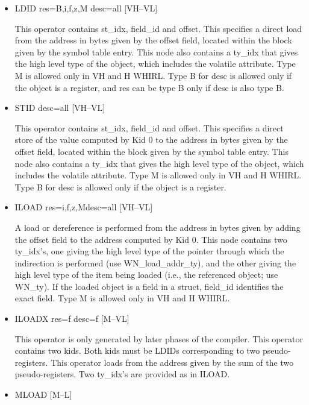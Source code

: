 \begin{itemize}

\item
{}%
LDID res=B,i,f,z,M desc=all \hfill [VH--VL]

This operator contains st\_idx, field\_id and offset. This specifies
a direct load from the address in bytes given by the offset field,
located within the
block given by the symbol table entry. This node also contains a
ty\_idx that gives the high level type of the object, which includes
the volatile attribute. Type M is allowed only in VH and H WHIRL.
Type B for desc is allowed only if the object is a register, and
res can be type B only if desc is also type B. 

\item
{}%
STID desc=all \hfill [VH--VL]

This operator contains st\_idx, field\_id and offset. This specifies
a direct store of the value computed by Kid 0 to the address in
bytes given by the
offset field, located within the block given by the symbol table
entry. This node also contains a ty\_idx that gives the high level
type of the object, which includes the volatile attribute. Type M
is allowed only in VH and H WHIRL. Type B for desc is allowed only
if the object is a register.

\item
{}%
ILOAD res=i,f,z,Mdesc=all \hfill [VH--VL]

A load or dereference is performed from the address in bytes given by
adding the offset field to the address computed by Kid 0. This node
contains two ty\_idx's, one giving the high level type of the pointer
through which the indirection is performed (use WN\_load\_addr\_ty),
and the other giving the high level type of the item being loaded
(i.e., the referenced object; use WN\_ty). If the loaded object is a
field in a struct, field\_id identifies the exact field.  Type M is
allowed only in VH and H WHIRL.

\item
{}%
ILOADX res=f desc=f \hfill [M--VL]

This operator is only generated by later phases of the compiler.
This operator contains two kids. Both kids must be
%
LDIDs corresponding to two
pseudo-registers. This operator loads from the address
given by the sum of the two pseudo-registers. Two ty\_idx's are
provided as in
%
ILOAD.

\item
{}%
MLOAD \hfill [M--L]


\end{itemize}
